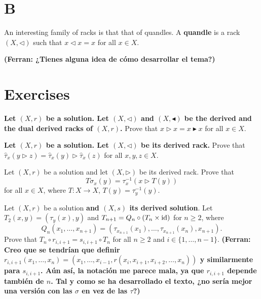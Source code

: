 \section*{B}

An interesting family of racks is that that of quandles. A \textbf{quandle} is a rack $(X,\triangleleft)$ 
such that $x\triangleleft x=x$ for all $x\in X$.

{\bf (Ferran: ¿Tienes alguna idea de c\'omo desarrollar el tema?)} 


\section*{Exercises}

\begin{prob}
    \label{prob:xx}
    {\bf Let $(X,r)$ be a solution. Let $(X,\triangleleft)$ and $(X,\blacktriangleleft)$ be the derived and the dual derived racks of $(X,r)$.} Prove that $x\triangleright x=x\blacktriangleright x$ for all $x\in X$. 
\end{prob}

\begin{prob}
    \label{prob:tau_hat}
    {\bf Let $(X,r)$ be a solution. Let $(X,\triangleleft)$  be its derived rack.}
    Prove that $\widehat{\tau}_x(y\triangleright z)=\widehat{\tau}_x(y)\triangleright \widehat{\tau}_x(z)$ for all $x,y,z\in X$. 
\end{prob}

\begin{prob}
    \label{prob:variationT}
    Let $(X,r)$ be a solution and let $(X,\triangleright)$ be its derived rack. 
    Prove that 
    \[
    T\sigma_x(y)=\tau_x^{-1}(x\triangleright T(y))
    \]
    for all $x\in X$, where $T\colon X\to X$, $T(y)=\tau_y^{-1}(y)$. 
\end{prob}

\begin{prob}
\label{prob:guitar}
Let $(X,r)$ be a solution {\bf and $(X,s)$ its derived solution}. Let $T_2(x,y)=(\tau_y(x),y)$ and
$T_{n+1}=Q_n\circ (T_n\times\operatorname{id})$ for $n\geq2$, where 
\[
Q_n(x_1,\dots,x_{n+1})=(\tau_{x_{n+1}}(x_1),\dots,\tau_{x_{n+1}}(x_n),x_{n+1}).
\]
Prove that $T_n\circ r_{i,i+1}=s_{i,i+1}\circ T_n$ for all $n\geq2$ and $i\in\{1,\dots,n-1\}$. 
{\bf (Ferran: Creo que se tendr\'{i}an que definir $r_{i,i+1}(x_1,\dots, x_n)=(x_1,\dots ,x_{i-1},r(x_i,x_{i+1},x_{i+2},\dots ,x_n))$ y similarmente para $s_{i,i+1}$. A\'un as\'{i}, la notaci\'on me parece mala, ya que $r_{i,i+1}$ depende también de $n$. Tal y como se ha desarrollado el texto, ¿no ser\'{i}a mejor una versi\'on con las $\sigma$ en vez de las $\tau$?)}
\end{prob}


